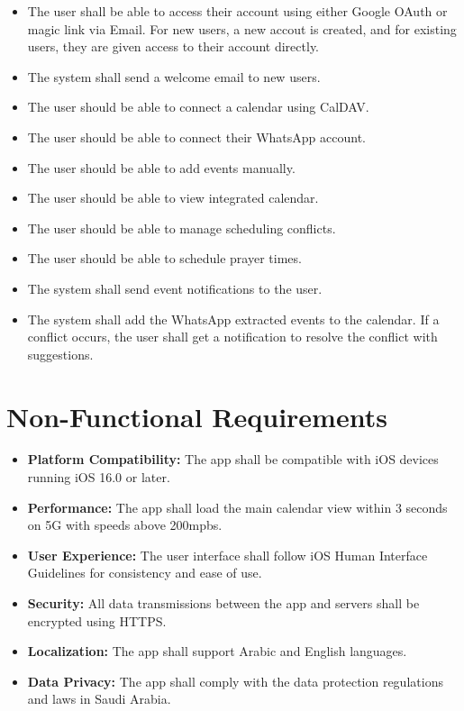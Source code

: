 \documentclass[12pt,a4paper]{report}
\begin{document}
\begin{itemize}
    \item The user shall be able to access their account using either Google OAuth or magic link via Email. For new users, a new accout is created, and for existing users, they are given access to their account directly.
    \item The system shall send a welcome email to new users.
    \item The user should be able to connect a calendar using CalDAV.
    \item The user should be able to connect their WhatsApp account.
    \item The user should be able to add events manually.
    \item The user should be able to view integrated calendar.
    \item The user should be able to manage scheduling conflicts.
    \item The user should be able to schedule prayer times.
    \item The system shall send event notifications to the user.
    \item The system shall add the WhatsApp extracted events to the calendar. If a conflict occurs, the user shall get a notification to resolve the conflict with suggestions.
\end{itemize}

\newpage

\section{Non-Functional Requirements}

\begin{itemize}
    \item \textbf{Platform Compatibility:} The app shall be compatible with iOS devices running iOS 16.0 or later.
    \item \textbf{Performance:} The app shall load the main calendar view within 3 seconds on 5G with speeds above 200mpbs.
    \item \textbf{User Experience:} The user interface shall follow iOS Human Interface Guidelines for consistency and ease of use.
    \item \textbf{Security:} All data transmissions between the app and servers shall be encrypted using HTTPS.
    \item \textbf{Localization:} The app shall support Arabic and English languages.
    \item \textbf{Data Privacy:} The app shall comply with the data protection regulations and laws in Saudi Arabia.
\end{itemize}
\newpage
\end{document}
